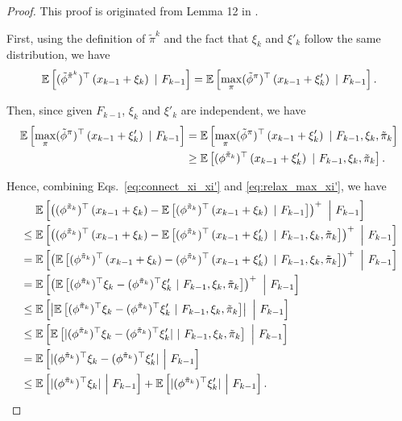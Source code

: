 \begin{proof}
	This proof is originated from Lemma 12 in \cite{efroni2021reinforcement}.
	
	First, using the definition of $\tilde{\pi}^k$ and the fact that $\xi_k$ and $\xi'_k$ follow the same distribution, we have
	\begin{align}
		\mathbb{E}\left[  (\tilde{\phi}^{\tilde{\pi}^k})^\top \left(  x_{k-1} + \xi_k  \right) \ |\ F_{k-1}   \right] = \mathbb{E}\left[  \max_{\pi} (\tilde{\phi}^{\pi})^\top \left(  x_{k-1} + \xi'_k  \right) \ |\ F_{k-1}   \right] . \label{eq:connect_xi_xi'}
	\end{align}
	
	Then, since given $F_{k-1}$, $\xi_k$ and $\xi'_k$ are independent, we have
	\begin{align}
		\mathbb{E}\left[  \max_{\pi} (\tilde{\phi}^{\pi})^\top \left(  x_{k-1} + \xi'_k  \right) \ |\ F_{k-1}   \right] &= \mathbb{E}\left[  \max_{\pi} (\tilde{\phi}^{\pi})^\top \left(  x_{k-1} + \xi'_k  \right) \ |\ F_{k-1} , \xi_k, \tilde{\pi}_k  \right]
		\nonumber\\
		&\geq \mathbb{E}\left[  (\phi^{\tilde{\pi}_k})^\top \left(  x_{k-1} + \xi'_k  \right) \ |\ F_{k-1}, \xi_k, \tilde{\pi}_k   \right] . \label{eq:relax_max_xi'}
	\end{align}
	
	Hence, combining Eqs.~\eqref{eq:connect_xi_xi'} and \eqref{eq:relax_max_xi'}, we have
	\begin{align*}
		&\quad\ \ex\mbr{ \sbr{(\phi^{\tilde{\pi}_k})^\top \sbr{ x_{k-1} + \xi_k } - \ex\mbr{ (\phi^{\tilde{\pi}_k})^\top \sbr{ x_{k-1} + \xi_k } \ |\ F_{k-1}  } }^{+} \ \Big|\ F_{k-1} }
		\\
		&\leq \ex\mbr{ \sbr{ (\phi^{\tilde{\pi}_k})^\top \sbr{ x_{k-1} + \xi_k }  - \ex\mbr{ (\phi^{\tilde{\pi}_k})^\top \sbr{ x_{k-1} + \xi'_k } \ |\ F_{k-1} , \xi_k, \tilde{\pi}_k  } }^{+} \ \Big|\ F_{k-1} } 
		\\
		&= \ex\mbr{ \sbr{ \ex\mbr{ (\phi^{\tilde{\pi}_k})^\top \sbr{ x_{k-1} + \xi_k }  -  (\phi^{\tilde{\pi}_k})^\top \sbr{ x_{k-1} + \xi'_k } \ |\ F_{k-1} , \xi_k, \tilde{\pi}_k  } }^{+} \ \Big|\ F_{k-1} } 
		\\
		&= \ex\mbr{ \sbr{ \ex\mbr{ (\phi^{\tilde{\pi}_k})^\top \xi_k   -  (\phi^{\tilde{\pi}_k})^\top \xi'_k \ |\ F_{k-1} , \xi_k, \tilde{\pi}_k  } }^{+} \ \Big|\ F_{k-1} }
		\\
		&\leq \ex\mbr{ \abr{ \ex\mbr{ (\phi^{\tilde{\pi}_k})^\top \xi_k   -  (\phi^{\tilde{\pi}_k})^\top \xi'_k \ |\ F_{k-1} , \xi_k, \tilde{\pi}_k  } } \ \Big|\ F_{k-1} }
		\\
		&\leq \ex\mbr{  \ex\mbr{ |(\phi^{\tilde{\pi}_k})^\top \xi_k   -  (\phi^{\tilde{\pi}_k})^\top \xi'_k| \ |\ F_{k-1} , \xi_k, \tilde{\pi}_k   } \ \Big|\ F_{k-1} }
		\\
		&= \ex\mbr{   | (\phi^{\tilde{\pi}_k})^\top \xi_k   -  (\phi^{\tilde{\pi}_k})^\top \xi'_k | \ \Big|\ F_{k-1} }
		\\
		&\leq \ex\mbr{   |(\phi^{\tilde{\pi}_k})^\top \xi_k| \ \Big|\ F_{k-1} } + \ex\mbr{   |  (\phi^{\tilde{\pi}_k})^\top \xi'_k| \ \Big|\ F_{k-1} } .
	\end{align*}
	
\end{proof}

